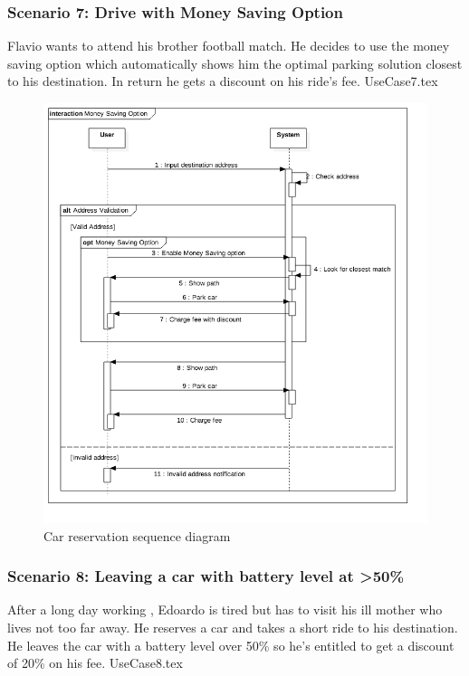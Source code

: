 \documentclass[12pt]{article}
\begin{document}
		\subsubsection{Scenario 7: Drive with Money Saving Option}
		Flavio wants to attend his brother football match. He decides to use the money saving 
		option which automatically shows him the optimal parking solution closest to his destination.
		In return he gets a discount on his ride's fee.
		\FloatBarrier
		{UseCase7.tex}
		\newpage
		\begin{figure}[htbp]
		 \caption{Car reservation sequence diagram}
		\includegraphics[scale=0.49]{Images/SequenceDiagram/MSO.png}
 	 	\end{figure}
 	 	\clearpage
		
		\subsubsection{Scenario 8: Leaving a car with battery level at \textgreater 50\%}
		After a long day working , Edoardo is tired but has to visit his ill mother who lives not too
		far away. He reserves a car and takes a short ride to his destination. He leaves the car with
		a battery level over 50\% so he's entitled to get a discount of 20\% on his fee.
		\FloatBarrier
		{UseCase8.tex}
		\newpage
		
\end{document}
